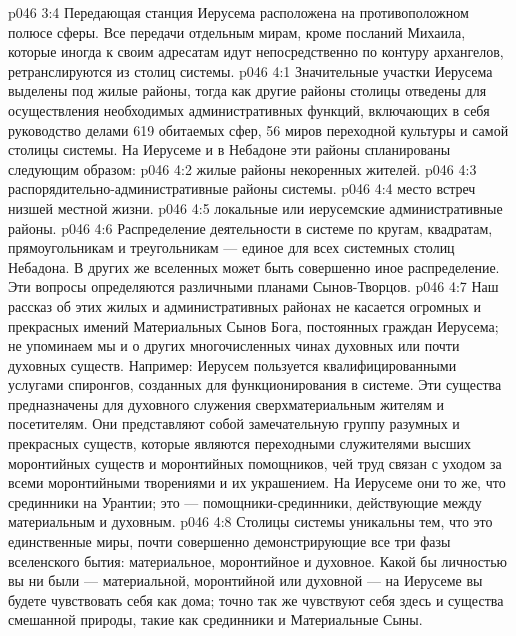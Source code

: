 \vs p046 3:4 \pc Передающая станция Иерусема расположена на противоположном полюсе сферы. Все передачи отдельным мирам, кроме посланий Михаила, которые иногда к своим адресатам идут непосредственно по контуру архангелов, ретранслируются из столиц системы.
\vs p046 4:1 Значительные участки Иерусема выделены под жилые районы, тогда как другие районы столицы отведены для осуществления необходимых административных функций, включающих в себя руководство делами 619 обитаемых сфер, 56 миров переходной культуры и самой столицы системы. На Иерусеме и в Небадоне эти районы спланированы следующим образом:
\vs p046 4:2 \bibnobreakspace {} жилые районы некоренных жителей.
\vs p046 4:3 \bibnobreakspace {} распорядительно\hyp{}административные районы системы.
\vs p046 4:4 \bibnobreakspace {} место встреч низшей местной жизни.
\vs p046 4:5 \bibnobreakspace {} локальные или иерусемские административные районы.
\vs p046 4:6 \pc Распределение деятельности в системе по кругам, квадратам, прямоугольникам и треугольникам --- единое для всех системных столиц Небадона. В других же вселенных может быть совершенно иное распределение. Эти вопросы определяются различными планами Сынов\hyp{}Творцов.
\vs p046 4:7 \pc Наш рассказ об этих жилых и административных районах не касается огромных и прекрасных имений Материальных Сынов Бога, постоянных граждан Иерусема; не упоминаем мы и о других многочисленных чинах духовных или почти духовных существ. Например: Иерусем пользуется квалифицированными услугами спиронгов, созданных для функционирования в системе. Эти существа предназначены для духовного служения сверхматериальным жителям и посетителям. Они представляют собой замечательную группу разумных и прекрасных существ, которые являются переходными служителями высших моронтийных существ и моронтийных помощников, чей труд связан с уходом за всеми моронтийными творениями и их украшением. На Иерусеме они то же, что срединники на Урантии; это --- помощники\hyp{}срединники, действующие между материальным и духовным.
\vs p046 4:8 Столицы системы уникальны тем, что это единственные миры, почти совершенно демонстрирующие все три фазы вселенского бытия: материальное, моронтийное и духовное. Какой бы личностью вы ни были --- материальной, моронтийной или духовной --- на Иерусеме вы будете чувствовать себя как дома; точно так же чувствуют себя здесь и существа смешанной природы, такие как срединники и Материальные Сыны.
